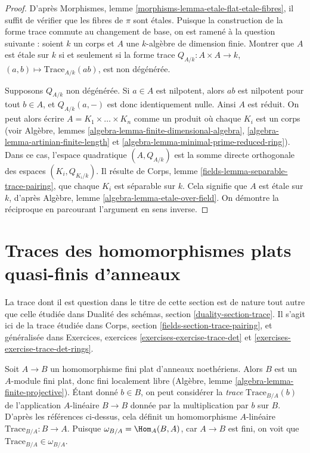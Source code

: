 \begin{proof}
D'après Morphismes, lemme \ref{morphisms-lemma-etale-flat-etale-fibres},
il suffit de vérifier que les fibres de $\pi$ sont étales.
Puisque la construction de la forme trace commute au changement de
base, on est ramené à la question suivante : soient $k$ un corps
et $A$ une $k$-algèbre de dimension finie. Montrer que
$A$ est étale sur $k$ si et seulement si la forme trace
$Q_{A/k} : A \times A \to k$, $(a, b) \mapsto \text{Trace}_{A/k}(ab)$,
est non dégénérée.

\medskip\noindent
Supposons $Q_{A/k}$ non dégénérée. Si $a \in A$ est nilpotent, alors
$ab$ est nilpotent pour tout $b \in A$, et $Q_{A/k}(a, -)$ est donc
identiquement nulle. Ainsi $A$ est réduit. On peut alors écrire
$A = K_1 \times \ldots \times K_n$ comme un produit où chaque $K_i$
est un corps (voir
Algèbre, lemmes \ref{algebra-lemma-finite-dimensional-algebra},
\ref{algebra-lemma-artinian-finite-length} et
\ref{algebra-lemma-minimal-prime-reduced-ring}).
Dans ce cas, l'espace
quadratique $(A, Q_{A/k})$ est la somme directe orthogonale des espaces
$(K_i, Q_{K_i/k})$. Il résulte de
Corps, lemme \ref{fields-lemma-separable-trace-pairing},
que chaque $K_i$ est séparable sur $k$. Cela signifie que $A$ est étale
sur $k$, d'après Algèbre, lemme \ref{algebra-lemma-etale-over-field}.
On démontre la réciproque en parcourant l'argument en sens inverse.
\end{proof}





\section{Traces des homomorphismes plats quasi-finis d'anneaux}
\label{section-quasi-finite-traces}

\noindent
La trace dont il est question dans le titre de cette section est de nature tout
autre que celle étudiée dans
Dualité des schémas, section \ref{duality-section-trace}.
Il s'agit ici de la trace
étudiée dans Corps, section \ref{fields-section-trace-pairing},
et généralisée dans Exercices, exercices \ref{exercises-exercise-trace-det} et
\ref{exercises-exercise-trace-det-rings}.

\medskip\noindent
Soit $A \to B$ un homomorphisme fini plat d'anneaux noethériens. Alors $B$ est un
$A$-module fini plat, donc fini localement libre
(Algèbre, lemme \ref{algebra-lemma-finite-projective}).
Étant donné $b \in B$, on peut considérer la {\it trace} $\text{Trace}_{B/A}(b)$
de l'application $A$-linéaire $B \to B$ donnée par
la multiplication par $b$ sur $B$. D'après les références ci-dessus, cela définit
un homomorphisme $A$-linéaire $\text{Trace}_{B/A} : B \to A$.
Puisque $\omega_{B/A} = \Hom_A(B, A)$, car $A \to B$ est fini, on voit
que $\text{Trace}_{B/A} \in \omega_{B/A}$.

